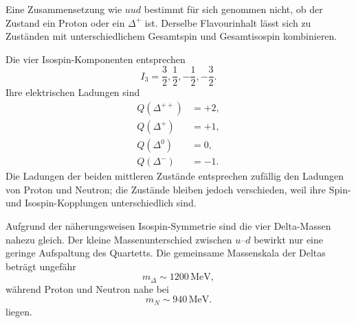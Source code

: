 Eine Zusammensetzung wie \(uud\) bestimmt für sich genommen nicht, ob der Zustand ein Proton oder ein \(\Delta^+\) ist. Derselbe Flavourinhalt lässt sich zu Zuständen mit unterschiedlichem Gesamtspin und Gesamtisospin kombinieren.

\begin{classroomqa}
\end{classroomqa}

\begin{classroomqa}
\end{classroomqa}

Die vier Isospin-Komponenten entsprechen
\begin{equation}
I_3=\frac32,\frac12,-\frac12,-\frac32.
\end{equation}
Ihre elektrischen Ladungen sind
\begin{align}
Q(\Delta^{++})&=+2,\\
Q(\Delta^{+})&=+1,\\
Q(\Delta^{0})&=0,\\
Q(\Delta^{-})&=-1.
\end{align}
Die Ladungen der beiden mittleren Zustände entsprechen zufällig den Ladungen von Proton und Neutron; die Zustände bleiben jedoch verschieden, weil ihre Spin- und Isospin-Kopplungen unterschiedlich sind.

Aufgrund der näherungsweisen Isospin-Symmetrie sind die vier Delta-Massen nahezu gleich. Der kleine Massenunterschied zwischen \(u\)--\(d\) bewirkt nur eine geringe Aufspaltung des Quartetts. Die gemeinsame Massenskala der Deltas beträgt ungefähr
\begin{equation}
m_\Delta\sim1200\,\mathrm{MeV},
\end{equation}
während Proton und Neutron nahe bei
\begin{equation}
m_N\sim940\,\mathrm{MeV}.
\end{equation}liegen.

